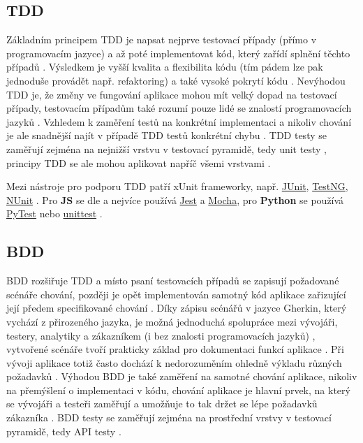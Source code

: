 \subsection{TDD}

Základním principem TDD je napsat nejprve testovací případy (přímo v programovacím jazyce) a až poté implementovat kód, který zařídí splnění těchto případů \cite{test-swtestinghelp2}. Výsledkem je vyšší kvalita a flexibilita kódu (tím pádem lze pak jednoduše provádět např. refaktoring) a také vysoké pokrytí kódu \cite{test-swtestinghelp2}. Nevýhodou TDD je, že změny ve fungování aplikace mohou mít velký dopad na testovací případy, testovacím případům také rozumí pouze lidé se znalostí programovacích jazyků \cite{test-swtestinghelp2}. Vzhledem k zaměření testů na konkrétní implementaci a nikoliv chování je ale snadnější najít v případě TDD testů konkrétní chybu  \cite{test-swtestinghelp2}. TDD testy se zaměřují zejména na nejnižší vrstvu v testovací pyramidě, tedy unit testy \cite{test-swtestinghelp1}, principy TDD se ale mohou aplikovat napříč všemi vrstvami \cite{test-dzone}.

Mezi nástroje pro podporu TDD patří xUnit frameworky, např. \href{https://junit.org/}{JUnit}, \href{https://testng.org/}{TestNG}, \href{https://nunit.org/}{NUnit} \cite{test-swtestinghelp2}. Pro \textbf{JS} se dle \cite{test-chart-js2} a \cite{test-chart-js1} nejvíce používá \href{https://jestjs.io/}{Jest} a \href{https://mochajs.org/}{Mocha}, pro \textbf{Python} se používá \href{https://docs.pytest.org/en/latest/}{PyTest} nebo \href{https://docs.python.org/3/library/unittest.html}{unittest} \cite{test-chart-python}.

\subsection{BDD}\label{subsec:bdd}

BDD rozšiřuje TDD a místo psaní testovacích případů se zapisují požadované scénáře chování, později je opět implementován samotný kód aplikace zařizující její předem specifikované chování \cite{test-swtestinghelp2}. Díky zápisu scénářů v jazyce Gherkin, který vychází z přirozeného jazyka, je možná jednoduchá spolupráce mezi vývojáři, testery, analytiky a zákazníkem (i bez znalosti programovacích jazyků) \cite{test-swtestinghelp2, test-cucumber1}, vytvořené scénáře tvoří prakticky základ pro dokumentaci funkcí aplikace \cite{test-smartbear2}. Při vývoji aplikace totiž často dochází k nedorozuměním ohledně výkladu různých požadavků \cite{test-smartbear2}. Výhodou BDD je také zaměření na samotné chování aplikace, nikoliv na přemýšlení o implementaci v kódu, chování aplikace je hlavní prvek, na který se vývojáři a testeři zaměřují a umožňuje to tak držet se lépe požadavků zákazníka \cite{test-swtestinghelp2}. BDD testy se zaměřují zejména na prostřední vrstvy v testovací pyramidě, tedy API testy \cite{test-swtestinghelp1}.

